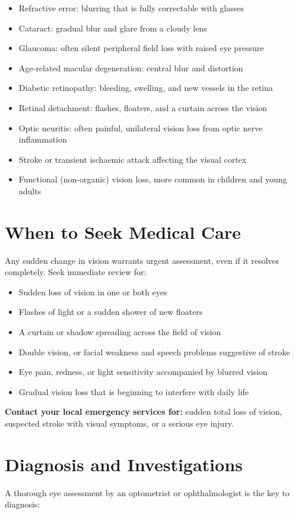 \begin{itemize}
    \item Refractive error: blurring that is fully correctable with glasses
    \item Cataract: gradual blur and glare from a cloudy lens
    \item Glaucoma: often silent peripheral field loss with raised eye pressure
    \item Age-related macular degeneration: central blur and distortion
    \item Diabetic retinopathy: bleeding, swelling, and new vessels in the retina
    \item Retinal detachment: flashes, floaters, and a curtain across the vision
    \item Optic neuritis: often painful, unilateral vision loss from optic nerve inflammation
    \item Stroke or transient ischaemic attack affecting the visual cortex
    \item Functional (non-organic) vision loss, more common in children and young adults
\end{itemize}

\section*{When to Seek Medical Care}
Any sudden change in vision warrants urgent assessment, even if it resolves completely. Seek immediate review for:

\begin{itemize}
    \item Sudden loss of vision in one or both eyes
    \item Flashes of light or a sudden shower of new floaters
    \item A curtain or shadow spreading across the field of vision
    \item Double vision, or facial weakness and speech problems suggestive of stroke
    \item Eye pain, redness, or light sensitivity accompanied by blurred vision
    \item Gradual vision loss that is beginning to interfere with daily life
\end{itemize}

\textbf{Contact your local emergency services for:} sudden total loss of vision, suspected stroke with visual symptoms, or a serious eye injury.

\section*{Diagnosis and Investigations}
A thorough eye assessment by an optometrist or ophthalmologist is the key to diagnosis:

